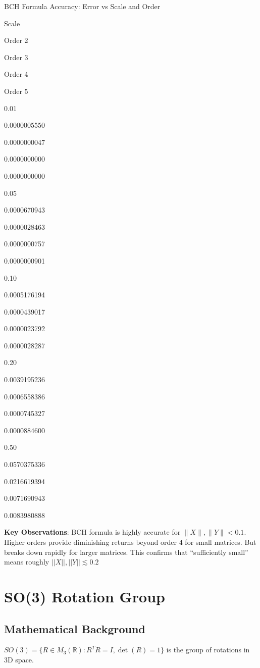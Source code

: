 \documentclass[
]{book}
\theoremstyle{definition}
\theoremstyle{definition}
\theoremstyle{definition}
\theoremstyle{definition}
\theoremstyle{remark}
\begin{document}
\label{tab:bch-comparison-table}BCH Formula Accuracy: Error vs Scale and Order

Scale

Order 2

Order 3

Order 4

Order 5

0.01

0.0000005550

0.0000000047

0.0000000000

0.0000000000

0.05

0.0000670943

0.0000028463

0.0000000757

0.0000000901

0.10

0.0005176194

0.0000439017

0.0000023792

0.0000028287

0.20

0.0039195236

0.0006558386

0.0000745327

0.0000884600

0.50

0.0570375336

0.0216619394

0.0071690943

0.0083980888

\textbf{Key Observations}: BCH formula is highly accurate for \(\|X\|, \|Y\| < 0.1\). Higher orders provide diminishing returns beyond order 4 for small matrices. But breaks down rapidly for larger matrices. This confirms that ``sufficiently small'' means roughly \(||X||, ||Y|| \lesssim 0.2\)

\section{SO(3) Rotation Group}\label{so3-rotation-group}

\subsection{Mathematical Background}\label{mathematical-background}

\(SO(3) = \{R \in M_3(\mathbb{R}) : R^TR = I, \det(R) = 1\}\) is the group of rotations in 3D space.
\end{document}
